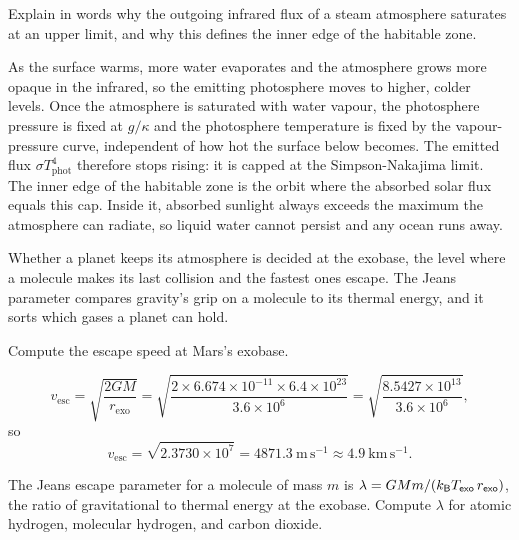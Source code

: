 \parti Explain in words why the outgoing infrared flux of a steam atmosphere saturates at an upper limit,
and why this defines the inner edge of the habitable zone.

\begin{solution}
As the surface warms, more water evaporates and the atmosphere grows more opaque in the infrared,
so the emitting photosphere moves to higher, colder levels.
Once the atmosphere is saturated with water vapour, the photosphere pressure is fixed at $g/\kappa$
and the photosphere temperature is fixed by the vapour-pressure curve, independent of how hot the surface below becomes.
The emitted flux $\sigma T_\mathrm{phot}^4$ therefore stops rising: it is capped at the Simpson-Nakajima limit.
The inner edge of the habitable zone is the orbit where the absorbed solar flux equals this cap.
Inside it, absorbed sunlight always exceeds the maximum the atmosphere can radiate,
so liquid water cannot persist and any ocean runs away.
\end{solution}


Whether a planet keeps its atmosphere is decided at the exobase, the level where a molecule makes its last collision and the fastest ones escape.
The Jeans parameter compares gravity's grip on a molecule to its thermal energy, and it sorts which gases a planet can hold.

\parti Compute the escape speed at Mars's exobase.

\begin{solution}
\[
v_\mathrm{esc} = \sqrt{\frac{2GM}{r_\mathrm{exo}}}
= \sqrt{\frac{2 \times 6.674\times10^{-11} \times 6.4\times10^{23}}{3.6\times10^{6}}}
= \sqrt{\frac{8.5427\times10^{13}}{3.6\times10^{6}}},
\]
so
\[
v_\mathrm{esc} = \sqrt{2.3730\times10^{7}} = 4871.3\ \mathrm{m\,s^{-1}} \approx 4.9\ \mathrm{km\,s^{-1}}.
\]
\end{solution}

\parti The Jeans escape parameter for a molecule of mass $m$ is $\lambda = GMm/(k_{\mathsf{B}} T_\mathsf{exo}\,r_\mathsf{exo})$,
the ratio of gravitational to thermal energy at the exobase.
Compute $\lambda$ for atomic hydrogen, molecular hydrogen, and carbon dioxide.

